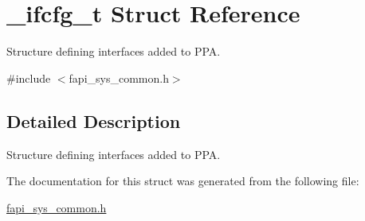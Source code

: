 \hypertarget{struct__ifcfg__t}{\section{\-\_\-ifcfg\-\_\-t Struct Reference}
\label{struct__ifcfg__t}
}


Structure defining interfaces added to P\-P\-A.  




{\ttfamily \#include $<$fapi\-\_\-sys\-\_\-common.\-h$>$}



\subsection{Detailed Description}
Structure defining interfaces added to P\-P\-A. 

The documentation for this struct was generated from the following file\-:\begin{DoxyCompactItemize}
\item 
\hyperlink{fapi__sys__common_8h}{fapi\-\_\-sys\-\_\-common.\-h}\end{DoxyCompactItemize}

